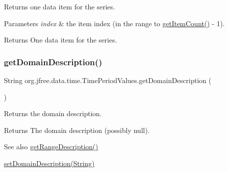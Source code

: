 Returns one data item for the series.


\begin{DoxyParams}{Parameters}
{\em index} & the item index (in the range {} to {\ttfamily \mbox{\hyperlink{classorg_1_1jfree_1_1data_1_1time_1_1_time_period_values_a45a779236ab4207245c09d8d85592e77}{get\+Item\+Count()}} -\/ 1}).\\
\hline
\end{DoxyParams}
\begin{DoxyReturn}{Returns}
One data item for the series. 
\end{DoxyReturn}
\mbox{\label{classorg_1_1jfree_1_1data_1_1time_1_1_time_period_values_a75e780afe26b96d7adc5ab6518818d14}} 
\subsubsection{\texorpdfstring{get\+Domain\+Description()}{getDomainDescription()}}
{\footnotesize\ttfamily String org.\+jfree.\+data.\+time.\+Time\+Period\+Values.\+get\+Domain\+Description (\begin{DoxyParamCaption}{ }\end{DoxyParamCaption})}

Returns the domain description.

\begin{DoxyReturn}{Returns}
The domain description (possibly {\ttfamily null}).
\end{DoxyReturn}
\begin{DoxySeeAlso}{See also}
\mbox{\hyperlink{classorg_1_1jfree_1_1data_1_1time_1_1_time_period_values_a7339bc03c769eac3b89517378667b94a}{get\+Range\+Description()}} 

\mbox{\hyperlink{classorg_1_1jfree_1_1data_1_1time_1_1_time_period_values_aac7ff6c5c3cb5112bf53122aa3c516bf}{set\+Domain\+Description(\+String)}} 
\end{DoxySeeAlso}
\mbox{\label{classorg_1_1jfree_1_1data_1_1time_1_1_time_period_values_a45a779236ab4207245c09d8d85592e77}} 
